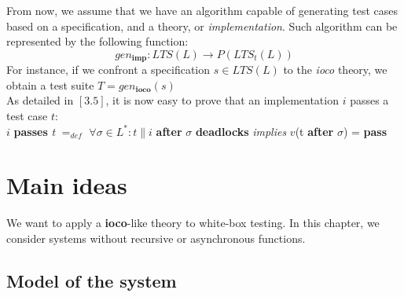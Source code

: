 \documentclass[a4paper]{report}
\begin{document}
From now, we assume that we have an algorithm capable of generating test cases based on a specification, and a theory, or \textit{implementation}. Such algorithm can be represented by the following function:
\[ gen_{\textbf{imp}}: LTS(L) \rightarrow P(LTS_t(L)) \]
For instance, if we confront a specification $s \in LTS(L)$ to the \textit{ioco} theory, we obtain a test suite $T = gen_{\textbf{ioco}}(s)$\\
\newline
As detailed in $[3.5]$, it is now easy to prove that an implementation $i$ passes a test case $t$:\\
$i$ \textbf{passes} \textit{t} $=_{def}$ $\forall \sigma \in L^* : t \| i$ \textbf{after} $\sigma$ \textbf{deadlocks} \textit{implies} $v$(t \textbf{after} $\sigma$) = \textbf{pass}\\


\chapter*{Main ideas}
We want to apply a \textbf{ioco}-like theory to white-box testing.
In this chapter, we consider systems without recursive or asynchronous functions.
\section*{Model of the system}
\end{document}
